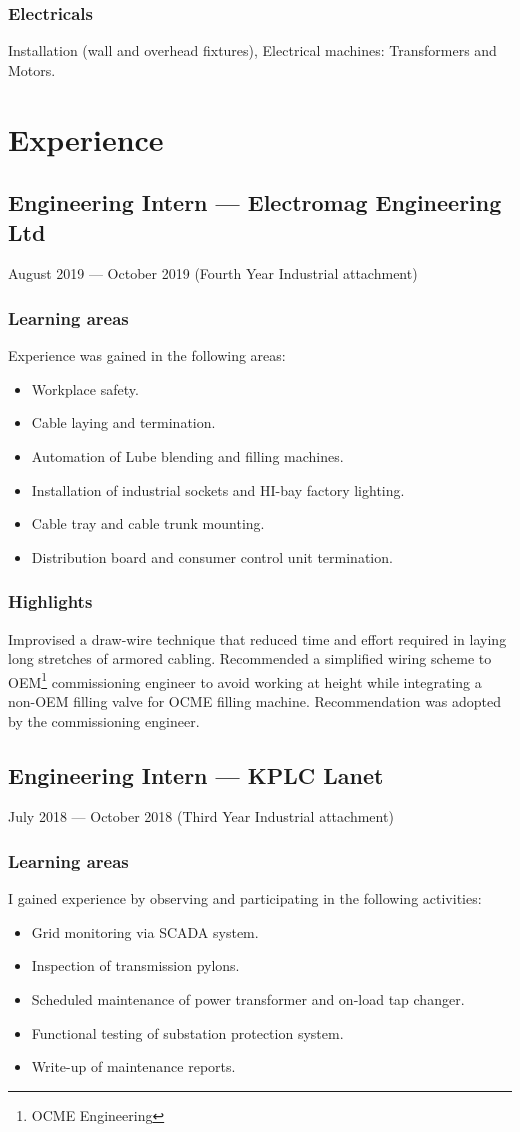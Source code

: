 \documentclass[a4paper]{article}
\begin{document}
\subsubsection{Electricals}
Installation (wall and overhead fixtures), Electrical machines: Transformers and Motors.
 
\section{Experience}
\subsection{Engineering Intern --- Electromag Engineering Ltd}
August 2019 --- October 2019 (Fourth Year Industrial attachment)
\subsubsection{Learning areas}
Experience was gained in the following areas:
\begin{itemize}
	\item Workplace safety.
	\item Cable laying and termination.
	\item Automation of Lube blending and filling machines.
	\item Installation of industrial sockets and HI-bay factory lighting.
	\item Cable tray and cable trunk mounting.
	\item Distribution board and consumer control unit termination.
\end{itemize}
\subsubsection{Highlights}
Improvised a draw-wire technique that reduced time and effort required in laying long stretches of armored cabling.
Recommended a simplified wiring scheme to OEM\footnote{OCME Engineering} commissioning engineer to avoid working at height while integrating a non-OEM filling valve for OCME filling machine. Recommendation was adopted by the commissioning engineer.

\subsection{Engineering Intern --- KPLC Lanet}
July 2018 --- October 2018 (Third Year Industrial attachment)
\subsubsection{Learning areas}
I gained experience by observing and participating in the following activities:
\begin{itemize}
	\item Grid monitoring via SCADA system.
	\item Inspection of transmission pylons.
	\item Scheduled maintenance of power transformer and on-load tap changer.
	\item Functional testing of substation protection system.
	\item Write-up of maintenance reports.
\end{itemize}
\end{document}
